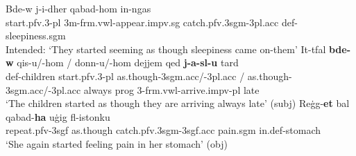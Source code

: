 \documentclass[output=paper]{LSP/langsci}
\begin{document}

\ea \label{mtaspcr}
\ea \label{nodehercrb}
\gll *Bde-w j-i-dher qabad-hom in-ng\textcrh as\\
start.{\sc pfv.3-pl} 3{\sc m}-{\sc frm.vwl}-appear.{\sc impv.sg} catch.{\sc pfv.3sgm-3pl.acc} {\sc def-}sleepiness.{\sc sgm}\\
\glt Intended: `They started seeming as though sleepiness came on-them'
\ex
\gll It-tfal {\bf{bde-w}} qis-u/-hom / donn-u/-hom dejjem qed {\bf{j-a-sl-u}} tard\\
{\sc def-}children start.{\sc pfv.3-pl} as.though-{\sc 3sgm.acc}/-{\sc 3pl.acc} / as.though-{\sc 3sgm.acc}/-{\sc 3pl.acc} always {\sc prog} 3-{\sc frm.vwl}-arrive.{\sc impv-pl} late\\
\glt `The children started as though they are arriving always late' \hfill{({\sc subj})}
\ex \label{nodehercra}
\gll Re{\.g}g\textcrh-{\bf{et}} b\textcrh al qabad-{\bf{ha}} u{\.g}ig{\textcrh} fl-istonku\\
repeat.{\sc pfv-3sgf} as.though catch.{\sc pfv.3sgm-3sgf.acc} pain.{\sc sgm} in.{\sc def}-stomach\\
\glt `She again started feeling pain in her stomach' \hfill{({\sc obj})}
\z
\z
 
\end{document}
